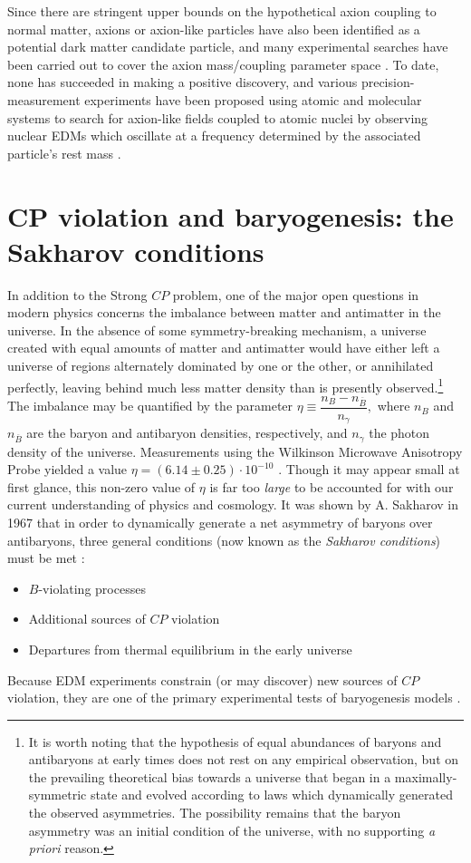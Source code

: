 \documentclass [10pt, twoside] {uwthesis}[2012/04/02]
\begin{document}
Since there are stringent upper bounds on the hypothetical axion coupling to normal matter, axions or axion-like particles have also been identified as a potential dark matter candidate particle, and many experimental searches have been carried out to cover the axion mass/coupling parameter space \cite{2005_Rosenberg_axion_review}. To date, none has succeeded in making a positive discovery, and various precision-measurement experiments have been proposed using atomic and molecular systems to search for axion-like fields coupled to atomic nuclei by observing nuclear EDMs which oscillate at a frequency determined by the associated particle's rest mass \cite{2013_Graham_and_Rajendran_Direct_ALP_Detection, 2014_Budker_CASPEr_proposal, 2014_Flambaum_axion}. 

\section{CP violation and baryogenesis: the Sakharov conditions}
In addition to the Strong $CP$ problem, one of the major open questions in modern physics concerns the imbalance between matter and antimatter in the universe. In the absence of some symmetry-breaking mechanism, a universe created with equal amounts of matter and antimatter would have either left a universe of regions alternately dominated by one or the other, or annihilated perfectly, leaving behind much less matter density than is presently observed.\footnote{It is worth noting that the hypothesis of equal abundances of baryons and antibaryons at early times does not rest on any empirical observation, but on the prevailing theoretical bias towards a universe that began in a maximally-symmetric state and evolved according to laws which dynamically generated the observed asymmetries. The possibility remains that the baryon asymmetry was an initial condition of the universe, with no supporting \textit{a priori} reason.} The imbalance may be quantified by the parameter $\eta\equiv\dfrac{n_B-n_{\overline{B}}}{n_{\gamma}},$ where $n_B$ and $n_{\overline{B}}$ are the baryon and antibaryon densities, respectively, and $n_{\gamma}$ the photon density of the universe. Measurements using the Wilkinson Microwave Anisotropy Probe yielded a value $\eta=(6.14\pm0.25)\cdot10^{-10}$ \cite{ClineNotes}. Though it may appear small at first glance, this non-zero value of $\eta$ is far too \textit{large} to be accounted for with our current understanding of physics and cosmology. It was shown by A. Sakharov in 1967 that in order to dynamically generate a net asymmetry of baryons over antibaryons, three general conditions (now known as the \textit{Sakharov conditions}) must be met \cite{1967_Sakharov}: \begin{itemize}\item $B$-violating processes \item Additional sources of $CP$ violation \item Departures from thermal equilibrium in the early universe\end{itemize} Because EDM experiments constrain (or may discover) new sources of $CP$ violation, they are one of the primary experimental tests of baryogenesis models \cite{2010_EDM_Baryogenesis}. 
\end{document}
